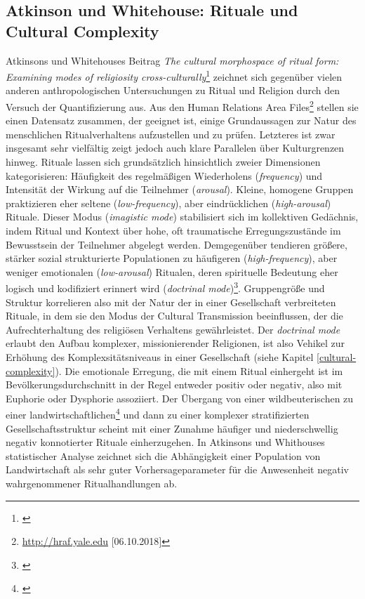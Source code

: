 \documentclass[openany,twoside,twocolumn]{book}
\let\rmarkdownfootnote\footnote%
\def\footnote{\protect\rmarkdownfootnote}
\begin{document}
\hypertarget{atkinson-und-whitehouse-rituale-und-cultural-complexity}{%
\subsection{Atkinson und Whitehouse: Rituale und Cultural
Complexity}\label{atkinson-und-whitehouse-rituale-und-cultural-complexity}}

Atkinsons und Whitehouses Beitrag \emph{The cultural morphospace of
ritual form: Examining modes of religiosity cross-culturally}\footnote{\textcite{atkinson_cultural_2011}}
zeichnet sich gegenüber vielen anderen anthropologischen Untersuchungen
zu Ritual und Religion durch den Versuch der Quantifizierung aus. Aus
den Human Relations Area Files\footnote{\url{http://hraf.yale.edu}
  {[}06.10.2018{]}} stellen sie einen Datensatz zusammen, der geeignet
ist, einige Grundaussagen zur Natur des menschlichen Ritualverhaltens
aufzustellen und zu prüfen. Letzteres ist zwar insgesamt sehr vielfältig
zeigt jedoch auch klare Parallelen über Kulturgrenzen hinweg. Rituale
lassen sich grundsätzlich hinsichtlich zweier Dimensionen
kategorisieren: Häufigkeit des regelmäßigen Wiederholens
(\emph{frequency}) und Intensität der Wirkung auf die Teilnehmer
(\emph{arousal}). Kleine, homogene Gruppen praktizieren eher seltene
(\emph{low-frequency}), aber eindrücklichen (\emph{high-arousal})
Rituale. Dieser Modus (\emph{imagistic mode}) stabilisiert sich im
kollektiven Gedächnis, indem Ritual und Kontext über hohe, oft
traumatische Erregungszustände im Bewusstsein der Teilnehmer abgelegt
werden. Demgegenüber tendieren größere, stärker sozial strukturierte
Populationen zu häufigeren (\emph{high-frequency}), aber weniger
emotionalen (\emph{low-arousal}) Ritualen, deren spirituelle Bedeutung
eher logisch und kodifiziert erinnert wird (\emph{doctrinal
mode})\footnote{\textcite{whitehouse_modes_2004}}. Gruppengröße und
Struktur korrelieren also mit der Natur der in einer Gesellschaft
verbreiteten Rituale, in dem sie den Modus der Cultural Transmission
beeinflussen, der die Aufrechterhaltung des religiösen Verhaltens
gewährleistet. Der \emph{doctrinal mode} erlaubt den Aufbau komplexer,
missionierender Religionen, ist also Vehikel zur Erhöhung des
Komplexsitätsniveaus in einer Gesellschaft (siehe Kapitel
\ref{cultural-complexity}). Die emotionale Erregung, die mit einem
Ritual einhergeht ist im Bevölkerungsdurchschnitt in der Regel entweder
positiv oder negativ, also mit Euphorie oder Dysphorie assoziiert. Der
Übergang von einer wildbeuterischen zu einer
landwirtschaftlichen\footnote{\textcite{whitehouse_modes_2010}} und dann
zu einer komplexer stratifizierten Gesellschaftsstruktur scheint mit
einer Zunahme häufiger und niederschwellig negativ konnotierter Rituale
einherzugehen. In Atkinsons und Whithouses statistischer Analyse
zeichnet sich die Abhängigkeit einer Population von Landwirtschaft als
sehr guter Vorhersageparameter für die Anwesenheit negativ
wahrgenommener Ritualhandlungen ab.
\end{document}
